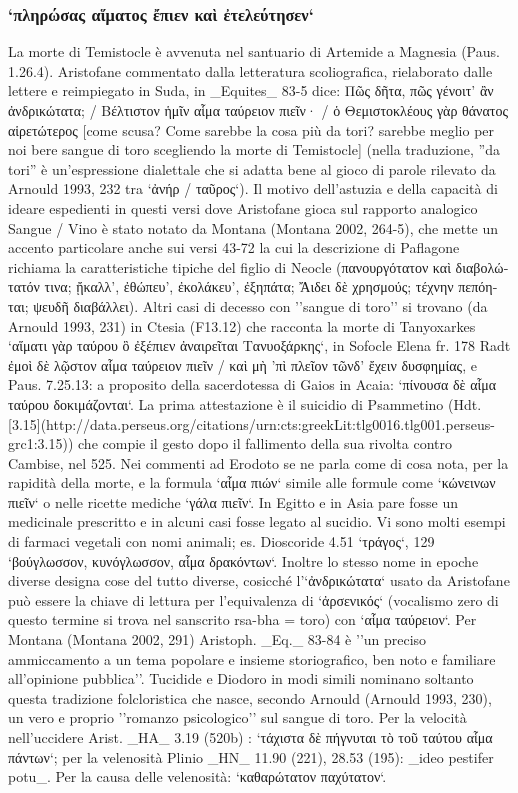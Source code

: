 {            \subsubsection{`πληρώσας αἵματος ἔπιεν καὶ ἐτελεύτησεν`}
         La morte di Temistocle è avvenuta nel santuario di Artemide a Magnesia (Paus. 1.26.4). Aristofane  commentato dalla letteratura scoliografica, rielaborato dalle lettere e reimpiegato in Suda, in _Equites_ 83-5 dice: \textgreek{Πῶς δῆτα, πῶς γένοιτ’ ἂν ἀνδρικώτατα; / Βέλτιστον ἡμῖν αἷμα ταύρειον πιεῖν· / ὁ Θεμιστοκλέους γὰρ θάνατος αἱρετώτερος} [come scusa? Come sarebbe la cosa più da tori? sarebbe meglio per noi bere sangue di toro scegliendo la morte di Temistocle] (nella traduzione, ''da tori'' è un'espressione dialettale che si adatta bene al gioco di parole rilevato da Arnould 1993, 232 tra `ἀνήρ / ταῦρος`). Il motivo dell'astuzia e della capacità di ideare espedienti in questi versi dove Aristofane  gioca sul rapporto analogico Sangue / Vino è stato notato da Montana (Montana 2002, 264-5), che mette un accento particolare anche sui versi 43-72 la cui la descrizione di Paflagone richiama la caratteristiche tipiche del figlio di Neocle (\textgreek{πανουργότατον καὶ διαβολώτατόν τινα; ᾔκαλλ’, ἐθώπευ’, ἐκολάκευ’, ἐξηπάτα; Ἄιδει δὲ χρησμούς; τέχνην πεπόηται;  ψευδῆ διαβάλλει}). Altri casi di decesso con ''sangue di toro'' si trovano (da Arnould 1993, 231) in Ctesia (F13.12) che racconta la morte di Tanyoxarkes `αἵματι γὰρ ταύρου ὃ ἐξέπιεν ἀναιρεῖται Τανυοξάρκης`, in Sofocle Elena fr. 178 Radt \textgreek{ἐμοὶ δὲ λῷστον αἷμα ταύρειον πιεῖν / καὶ μὴ ’πὶ πλεῖον τῶνδ’ ἔχειν δυσφημίας}, e Paus. 7.25.13: a proposito della sacerdotessa di Gaios in Acaia: `πίνουσα δὲ αἷμα ταύρου δοκιμάζονται`. La prima attestazione è il suicidio di Psammetino (Hdt. [3.15](http://data.perseus.org/citations/urn:cts:greekLit:tlg0016.tlg001.perseus-grc1:3.15)) che compie il gesto dopo il fallimento della sua rivolta contro Cambise, nel 525. Nei commenti ad Erodoto se ne parla come di cosa nota, per la rapidità della morte, e la formula `αἷμα πιών` simile alle formule come `κώνεινων πιεῖν` o nelle ricette mediche `γάλα πιεῖν`. In Egitto e in Asia pare fosse un medicinale prescritto e in alcuni casi fosse legato al sucidio. Vi sono molti esempi di farmaci vegetali con nomi animali; es. Dioscoride 4.51 `τράγος`, 129 `βούγλωσσον, κυνόγλωσσον, αἷμα δρακόντων`. Inoltre lo stesso nome in epoche diverse designa cose del tutto diverse, cosicché l'`ἀνδρικώτατα` usato da Aristofane  può essere la chiave di lettura per l'equivalenza di `ἀρσενικός` (vocalismo zero di questo termine si trova nel sanscrito rsa-bha = toro) con `αἷμα ταύρειον`. Per Montana (Montana 2002, 291) Aristoph. _Eq._ 83-84 è ''un preciso ammiccamento a un tema popolare e insieme storiografico, ben noto  e familiare all'opinione pubblica''. Tucidide e  Diodoro in modi simili nominano soltanto questa tradizione folcloristica che nasce, secondo Arnould (Arnould 1993, 230), un vero e proprio ''romanzo psicologico'' sul sangue di toro. Per la velocità nell'uccidere Arist. _HA_ 3.19 (520b) : `τάχιστα δὲ πήγνυται τὸ τοῦ ταύτου αἷμα πάντων`; per la velenosità Plinio _HN_ 11.90 (221), 28.53 (195): _ideo pestifer potu_. Per la causa delle velenosità: `καθαρώτατον παχύτατον`. }
